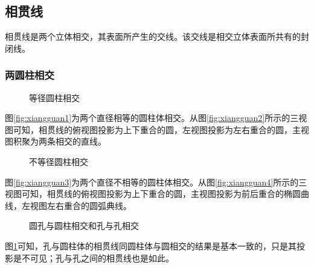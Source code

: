 \subsection{相贯线}
相贯线是两个立体相交，其表面所产生的交线。该交线是相交立体表面所共有的封闭线。
\subsubsection{两圆柱相交}
 \begin{figure}[htbp]
 \centering
{}\hspace{60pt}
\caption{等径圆柱相交}
\end{figure}
图\ref{fig:xiangguan1}为两个直径相等的圆柱体相交。从图\ref{fig:xiangguan2}所示的三视图可知，相贯线的俯视图投影为上下重合的圆，左视图投影为左右重合的圆，主视图积聚为两条相交的直线。

 \begin{figure}[htbp]
 \centering
{}\hspace{60pt}
\caption{不等径圆柱相交}
\end{figure}
图\ref{fig:xiangguan3}为两个直径不相等的圆柱体相交。从图\ref{fig:xiangguan4}所示的三视图可知，相贯线的俯视图投影为上下重合的圆，主视图投影为前后重合的椭圆曲线，左视图左右重合的圆弧典线。

 \begin{figure}[htbp]
 \centering
{}\hspace{10pt}
\hspace{10pt}
\hspace{10pt}
\caption{圆孔与圆柱相交和孔与孔相交}\label{fig:xiangguankong}
\end{figure}
图\ref{fig:xiangguankong}可知，孔与圆柱体的相贯线同圆柱体与圆相交的结果是基本一致的，只是其投影是不可见；孔与孔之间的相贯线也是如此。
